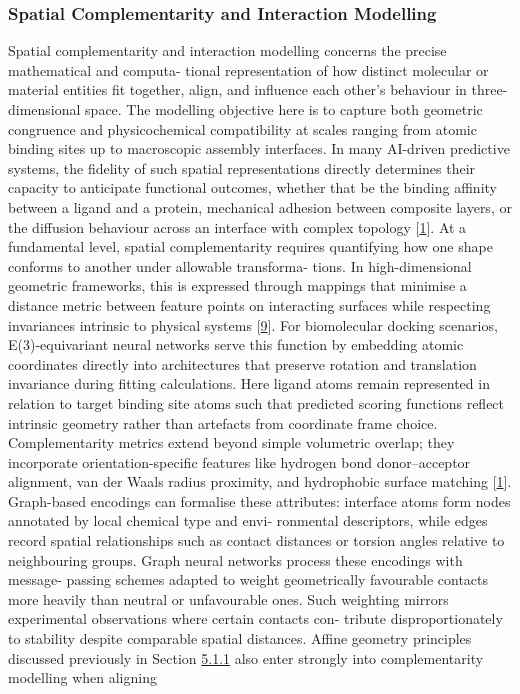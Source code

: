 \documentclass[
]{article}
\begin{document}
\subsubsection{Spatial Complementarity and Interaction
Modelling}\label{spatial-complementarity-and-interaction-modelling}

Spatial complementarity and interaction modelling concerns the precise
mathematical and computa- tional representation of how distinct
molecular or material entities fit together, align, and influence each
other's behaviour in three-dimensional space. The modelling objective
here is to capture both geometric congruence and physicochemical
compatibility at scales ranging from atomic binding sites up to
macroscopic assembly interfaces. In many AI-driven predictive systems,
the fidelity of such spatial representations directly determines their
capacity to anticipate functional outcomes, whether that be the binding
affinity between a ligand and a protein, mechanical adhesion between
composite layers, or the diffusion behaviour across an interface with
complex topology {[}\hyperref[_bookmark41]{1}{]}. At a fundamental
level, spatial complementarity requires quantifying how one shape
conforms to another under allowable transforma- tions. In
high-dimensional geometric frameworks, this is expressed through
mappings that minimise a distance metric between feature points on
interacting surfaces while respecting invariances intrinsic to physical
systems {[}\hyperref[_bookmark49]{9}{]}. For biomolecular docking
scenarios, E(3)-equivariant neural networks serve this function by
embedding atomic coordinates directly into architectures that preserve
rotation and translation invariance during fitting calculations. Here
ligand atoms remain represented in relation to target binding site atoms
such that predicted scoring functions reflect intrinsic geometry rather
than artefacts from coordinate frame choice. Complementarity metrics
extend beyond simple volumetric overlap; they incorporate
orientation-specific features like hydrogen bond donor--acceptor
alignment, van der Waals radius proximity, and hydrophobic surface
matching {[}\hyperref[_bookmark41]{1}{]}. Graph-based encodings can
formalise these attributes: interface atoms form nodes annotated by
local chemical type and envi- ronmental descriptors, while edges record
spatial relationships such as contact distances or torsion angles
relative to neighbouring groups. Graph neural networks process these
encodings with message- passing schemes adapted to weight geometrically
favourable contacts more heavily than neutral or unfavourable ones. Such
weighting mirrors experimental observations where certain contacts con-
tribute disproportionately to stability despite comparable spatial
distances. Affine geometry principles discussed previously in Section
\hyperref[affine-projective-and-metric-geometry]{5.1.1} also enter
strongly into complementarity modelling when aligning
\end{document}
